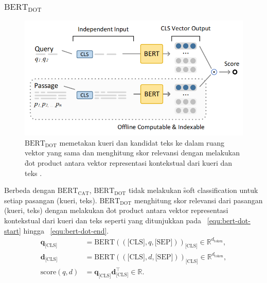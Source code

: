 		\subsubsection{$\text{BERT}_{\text{DOT}}$}
		\label{sec:bert-dot}
		\begin{figure}
			\centering
			\includegraphics[width=1\textwidth]{assets/pics/bertdot.png}
			\caption{$\text{BERT}_{\text{DOT}}$ memetakan kueri dan kandidat teks ke dalam ruang vektor yang sama dan menghitung skor relevansi dengan melakukan \f{dot product} antara vektor representasi kontekstual dari kueri dan teks \citep{irlecture}.}
			\label{fig:bert-dot}
		\end{figure}

		Berbeda dengan $\text{BERT}_{\text{CAT}}$, $\text{BERT}_{\text{DOT}}$ tidak melakukan \f{soft classification} untuk setiap pasangan (kueri, teks). $\text{BERT}_{\text{DOT}}$ menghitung skor relevansi dari pasangan (kueri, teks) dengan melakukan \f{dot product} antara vektor representasi kontekstual dari kueri dan teks seperti yang ditunjukkan pada \equ~\ref{equ:bert-dot-start} hingga \equ~\ref{equ:bert-dot-end}.
		\begin{align}
			\label{equ:bert-dot-start}
			\mathbf{q}_{\text{[CLS]}} &= \text{BERT}((\text{[CLS]}, q, \text{[SEP]}))_{\text{[CLS]}} \in \mathbb{R}^{d_{\text{token}}}, \\
			\mathbf{d}_{\text{[CLS]}} &= \text{BERT}((\text{[CLS]}, d, \text{[SEP]}))_{\text{[CLS]}} \in \mathbb{R}^{d_{\text{token}}}, \\
			\label{equ:bert-dot-end}
			\text{score}(q,d) &= \mathbf{q}_{\text{[CLS]}} \mathbf{d}_{\text{[CLS]}}^{\top} \in \mathbb{R}.
		\end{align}

